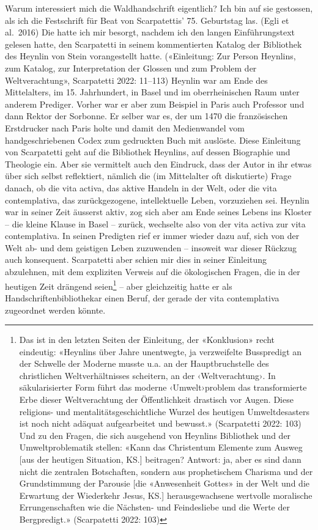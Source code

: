 \documentclass[a4paper,
fontsize=11pt,
oneside,
numbers=noperiodatend,
parskip=half-,
bibliography=totoc,
final
]{scrartcl}
\begin{document}
Warum interessiert mich die Waldhandschrift eigentlich? Ich bin auf sie
gestossen, als ich die Festschrift für Beat von Scarpatettis' 75.
Geburtstag las. (Egli et al.~2016) Die hatte ich mir besorgt, nachdem
ich den langen Einführungstext gelesen hatte, den Scarpatetti in seinem
kommentierten Katalog der Bibliothek des Heynlin von Stein vorangestellt
hatte. («Einleitung: Zur Person Heynlins, zum Katalog, zur
Interpretation der Glossen und zum Problem der Weltverachtung»,
Scarpatetti 2022: 11--113) Heynlin war am Ende des Mittelalters, im 15.
Jahrhundert, in Basel und im oberrheinischen Raum unter anderem
Prediger. Vorher war er aber zum Beispiel in Paris auch Professor und
dann Rektor der Sorbonne. Er selber war es, der um 1470 die
französischen Erstdrucker nach Paris holte und damit den Medienwandel
vom handgeschriebenen Codex zum gedruckten Buch mit auslöste. Diese
Einleitung von Scarpatetti geht auf die Bibliothek Heynlins, auf dessen
Biographie und Theologie ein. Aber sie vermittelt auch den Eindruck,
dass der Autor in ihr etwas über sich selbst reflektiert, nämlich die
(im Mittelalter oft diskutierte) Frage danach, ob die vita activa, das
aktive Handeln in der Welt, oder die vita contemplativa, das
zurückgezogene, intellektuelle Leben, vorzuziehen sei. Heynlin war in
seiner Zeit äusserst aktiv, zog sich aber am Ende seines Lebens ins
Kloster -- die kleine Klause in Basel -- zurück, wechselte also von der
vita activa zur vita contemplativa. In seinen Predigten rief er immer
wieder dazu auf, sich von der Welt ab- und dem geistigen Leben
zuzuwenden -- insoweit war dieser Rückzug auch konsequent. Scarpatetti
aber schien mir dies in seiner Einleitung abzulehnen, mit dem expliziten
Verweis auf die ökologischen Fragen, die in der heutigen Zeit drängend
seien\footnote{Das ist in den letzten Seiten der Einleitung, der
  «Konklusion» recht eindeutig: «Heynlins über Jahre unentwegte, ja
  verzweifelte Busspredigt an der Schwelle der Moderne musste u.a. an
  der Hauptbruchstelle des christlichen Weltverhältnisses scheitern, an
  der ‹Weltverachtung›. In säkularisierter Form führt das moderne
  ‹Umwelt›problem das transformierte Erbe dieser Weltverachtung der
  Öffentlichkeit drastisch vor Augen. Diese religions- und
  mentalitätsgeschichtliche Wurzel des heutigen Umweltdesasters ist noch
  nicht adäquat aufgearbeitet und bewusst.» (Scarpatetti 2022: 103) Und
  zu den Fragen, die sich ausgehend von Heynlins Bibliothek und der
  Umweltproblematik stellen: «Kann das Christentum Elemente zum Ausweg
  {[}aus der heutigen Situation, KS.{]} beitragen? Antwort: ja, aber es
  sind dann nicht die zentralen Botschaften, sondern aus prophetischem
  Charisma und der Grundstimmung der Parousie {[}die «Anwesenheit
  Gottes» in der Welt und die Erwartung der Wiederkehr Jesus, KS.{]}
  herausgewachsene wertvolle moralische Errungenschaften wie die
  Nächsten- und Feindesliebe und die Werte der Bergpredigt.»
  (Scarpatetti 2022: 103)} -- aber gleichzeitig hatte er als
Handschriftenbibliothekar einen Beruf, der gerade der vita contemplativa
zugeordnet werden könnte.
\end{document}
